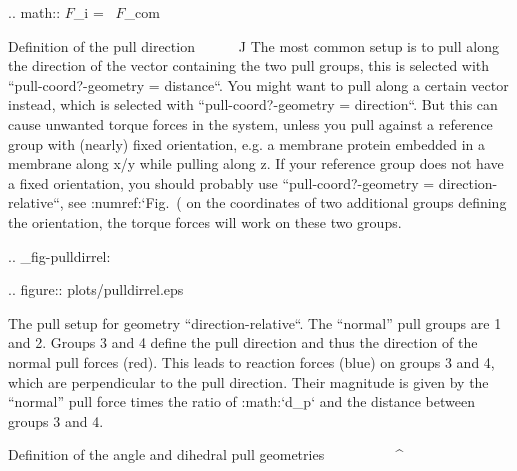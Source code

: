 .. math:: {\mbox{\boldmath ${F}$}}_{\!i} =  \, {\mbox{\boldmath ${F}$}}_{\!com}

Definition of the pull direction
^^^^^^^^^^^^^^^^^^^^^^^^^^^^^^^^

The most common setup is to pull along the direction of the vector
containing the two pull groups, this is selected with
``pull-coord?-geometry = distance``. You might want to pull
along a certain vector instead, which is selected with
``pull-coord?-geometry = direction``. But this can cause
unwanted torque forces in the system, unless you pull against a
reference group with (nearly) fixed orientation, e.g. a membrane protein
embedded in a membrane along x/y while pulling along z. If your
reference group does not have a fixed orientation, you should probably
use ``pull-coord?-geometry = direction-relative``, see
:numref:`Fig. (%
on the coordinates of two additional groups defining the orientation,
the torque forces will work on these two groups.

.. _fig-pulldirrel:

.. figure:: plots/pulldirrel.eps

   The pull setup for geometry ``direction-relative``. The
   “normal” pull groups are 1 and 2. Groups 3 and 4 define the pull
   direction and thus the direction of the normal pull forces (red).
   This leads to reaction forces (blue) on groups 3 and 4, which are
   perpendicular to the pull direction. Their magnitude is given by the
   “normal” pull force times the ratio of :math:`d_p` and the distance
   between groups 3 and 4.

Definition of the angle and dihedral pull geometries
^^^^^^^^^^^^^^^^^^^^^^^^^^^^^^^^^^^^^^^^^^^^^^^^^^^^

